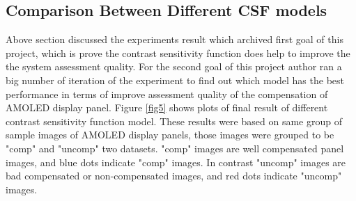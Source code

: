 \documentclass{article}
\begin{document}
\subsection{Comparison Between Different CSF models}

Above section discussed the experiments result which archived first goal of this project, which is prove the contrast sensitivity function does help to improve the the system assessment quality. For the second goal of this project author ran a big number of iteration of the experiment to find out which model has the best performance in terms of improve assessment quality of the compensation of AMOLED display panel. Figure \ref{fig5} shows plots of final result of different contrast sensitivity function model. These results were based on same group of sample images of AMOLED display panels, those images were grouped to be "comp" and "uncomp" two datasets. "comp" images are well compensated panel images, and blue dots indicate "comp" images. In contrast "uncomp" images are bad compensated or non-compensated images, and red dots indicate "uncomp" images.
\end{document}
